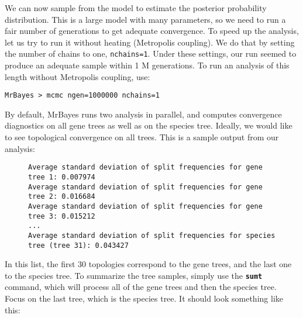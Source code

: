 \documentclass[12pt]{book}
\newcommand{\ttt}[1]{\texttt{#1}}
\newcommand{\tb}[1]{\ttt{\textbf{#1}}}
\begin{document}
We can now sample from the model to estimate the posterior probability distribution. This is a
large model with many parameters, so we need to run a fair number of generations to get adequate
convergence. To speed up the analysis, let us try to run it without heating (Metropolis coupling).
We do that by setting the number of chains to one, \texttt{nchains=1}. Under these settings, our
run seemed to produce an adequate sample within 1 M generations. To run an analysis of this length
without Metropolis coupling, use:

\begin{Verbatim}
MrBayes > mcmc ngen=1000000 nchains=1
\end{Verbatim}

By default, MrBayes runs two analysis in parallel, and computes convergence diagnostics on all gene
trees as well as on the species tree. Ideally, we would like to see topological convergence on all
trees. This is a sample output from our analysis:

\begin{figure}[h]
\centering
\begin{BVerbatim}
Average standard deviation of split frequencies for gene tree 1: 0.007974
Average standard deviation of split frequencies for gene tree 2: 0.016684
Average standard deviation of split frequencies for gene tree 3: 0.015212
...
Average standard deviation of split frequencies for species tree (tree 31): 0.043427
\end{BVerbatim}
\end{figure}

In this list, the first 30 topologies correspond to the gene trees, and the last one to the species
tree. To summarize the tree samples, simply use the \tb{sumt} command, which will process all of
the gene trees and then the species tree. Focus on the last tree, which is the species tree. It
should look something like this:
\end{document}
